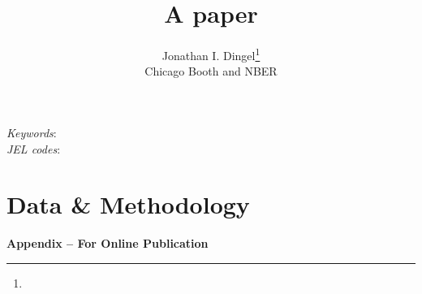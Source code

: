 \documentclass[11pt]{article}
\title{A paper}
\author{Jonathan I. Dingel\thanks{\dingelemail} \\ Chicago Booth and NBER}
\date{\monthname[\the\month] \the\year}
\begin{document}



\begin{abstract}
\end{abstract}
\vspace{1cm}
{\small
\noindent \textit{Keywords}:  \\
\textit{JEL codes}:
}
\thispagestyle{empty}
\newpage
\setcounter{page}{1}




\section{Data \& Methodology}









{}

\newpage
\clearpage

\clearpage

\begin{center} \Large \textbf{Appendix -- For Online Publication} \end{center}
\appendix
{}

%
%
%
\end{document}
